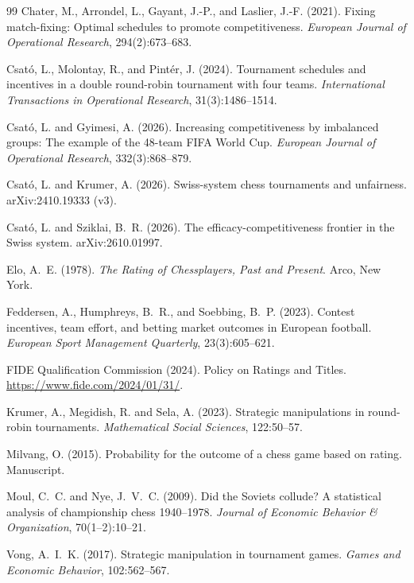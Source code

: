 \documentclass[11pt]{article}
\theoremstyle{definition}
\begin{document}
\begin{thebibliography}{99}
Chater, M., Arrondel, L., Gayant, J.-P., and Laslier, J.-F. (2021).
Fixing match-fixing: Optimal schedules to promote competitiveness.
\emph{European Journal of Operational Research}, 294(2):673--683.

Csat\'o, L., Molontay, R., and Pint\'er, J. (2024).
Tournament schedules and incentives in a double round-robin tournament with
four teams. \emph{International Transactions in Operational Research},
31(3):1486--1514.

Csat\'o, L. and Gyimesi, A. (2026).
Increasing competitiveness by imbalanced groups: The example of the 48-team
FIFA World Cup. \emph{European Journal of Operational Research},
332(3):868--879.

Csat\'o, L. and Krumer, A. (2026).
Swiss-system chess tournaments and unfairness. arXiv:2410.19333 (v3).

Csat\'o, L. and Sziklai, B.~R. (2026).
The efficacy-competitiveness frontier in the Swiss system. arXiv:2610.01997.

Elo, A.~E. (1978). \emph{The Rating of Chessplayers, Past and Present}.
Arco, New York.

Feddersen, A., Humphreys, B.~R., and Soebbing, B.~P. (2023).
Contest incentives, team effort, and betting market outcomes in European
football. \emph{European Sport Management Quarterly}, 23(3):605--621.

FIDE Qualification Commission (2024). Policy on Ratings and Titles.
\url{https://www.fide.com/2024/01/31/}.

Krumer, A., Megidish, R. and Sela, A. (2023). Strategic manipulations in
round-robin tournaments. \emph{Mathematical Social Sciences}, 122:50--57.

Milvang, O. (2015). Probability for the outcome of a chess game based on
rating. Manuscript.

Moul, C.~C. and Nye, J.~V.~C. (2009). Did the Soviets collude? A statistical
analysis of championship chess 1940--1978. \emph{Journal of Economic Behavior
\& Organization}, 70(1--2):10--21.

Vong, A.~I.~K. (2017). Strategic manipulation in tournament games.
\emph{Games and Economic Behavior}, 102:562--567.

\end{thebibliography}
\end{document}
